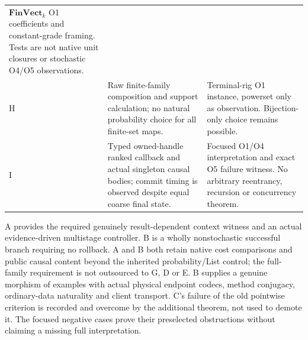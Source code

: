 \documentclass[11pt,a4paper]{article}
\theoremstyle{definition}
\newcommand{\FinVect}{\mathbf{FinVect}}
\begin{document}
\begin{longtable}{@{}p{.08\linewidth}p{.45\linewidth}p{.37\linewidth}@{}}
$\FinVect_k$ O1 coefficients and constant-grade framing. Tests are not
native unit closures or stochastic O4/O5 observations.\\
H&Raw finite-family composition and support calculation; no natural
probability choice for all finite-set maps.&Terminal-rig O1 instance,
powerset only as observation. Bijection-only choice remains possible.\\
I&Typed owned-handle ranked callback and actual singleton causal bodies;
commit timing is observed despite equal coarse final state.&Focused O1/O4
interpretation and exact O5 failure witness. No arbitrary reentrancy,
recursion or concurrency theorem.\\
\bottomrule
\end{longtable}

A provides the required genuinely result-dependent context witness and
an actual evidence-driven multistage controller. B is a wholly
nonstochastic successful branch requiring no rollback. A and B both retain
native cost comparisons and public causal content beyond the inherited
probability/List control; the full-family requirement is not outsourced
to G, D or E. B supplies a genuine morphism of examples with actual
physical endpoint codecs, method conjugacy, ordinary-data naturality and
client transport. C's failure of the old pointwise criterion is recorded
and overcome by the additional theorem, not used to demote it. The
focused negative cases prove their preselected obstructions without
claiming a missing full interpretation.
\end{document}
